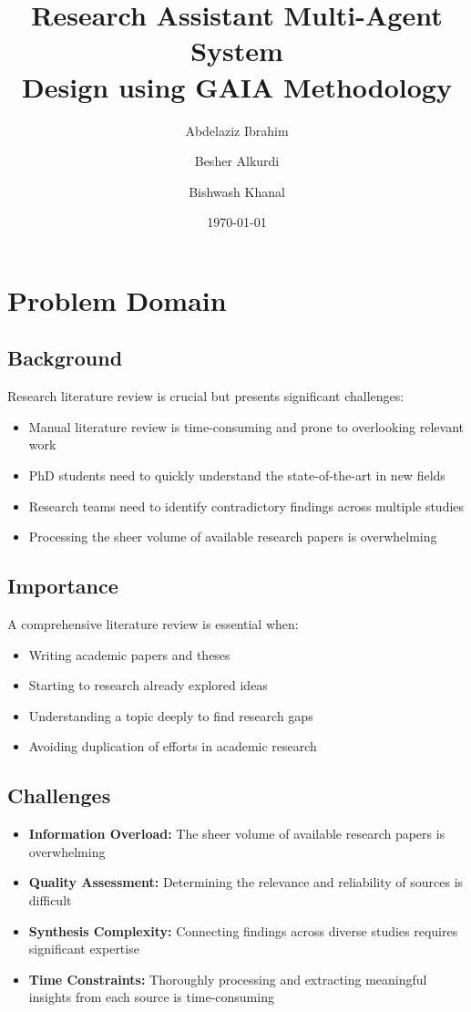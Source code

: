 \documentclass[11pt,a4paper]{article}
\title{
    {\LARGE\textbf{Research Assistant Multi-Agent System}}\\
    \vspace{0.5cm}
    {\large\textbf{Design using GAIA Methodology}}\\
    \vspace{0.5cm}
}
\author{Abdelaziz Ibrahim \and Besher Alkurdi \and Bishwash Khanal}
\date{\today}
\begin{document}
\maketitle
\thispagestyle{fancy}

\section*{Problem Domain}
\subsection*{Background}
Research literature review is crucial but presents significant challenges:
\begin{itemize}
    \item Manual literature review is time-consuming and prone to overlooking relevant work
    \item PhD students need to quickly understand the state-of-the-art in new fields
    \item Research teams need to identify contradictory findings across multiple studies
    \item Processing the sheer volume of available research papers is overwhelming
\end{itemize}

\subsection*{Importance}
A comprehensive literature review is essential when:
\begin{itemize}
    \item Writing academic papers and theses
    \item Starting to research already explored ideas
    \item Understanding a topic deeply to find research gaps
    \item Avoiding duplication of efforts in academic research
\end{itemize}

\subsection*{Challenges}
\begin{itemize}
    \item \textbf{Information Overload:} The sheer volume of available research papers is overwhelming
    \item \textbf{Quality Assessment:} Determining the relevance and reliability of sources is difficult
    \item \textbf{Synthesis Complexity:} Connecting findings across diverse studies requires significant expertise
    \item \textbf{Time Constraints:} Thoroughly processing and extracting meaningful insights from each source is time-consuming
\end{itemize}
\end{document}
